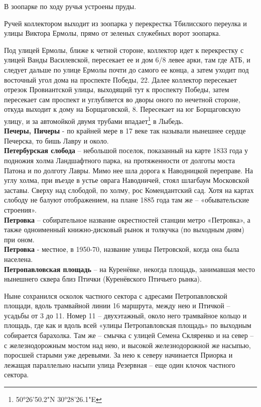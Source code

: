 В зоопарке по ходу ручья устроены пруды.

Ручей коллектором выходит из зоопарка у перекрестка Тбилисского переулка и улицы Виктора Ермолы, прямо от зеленых служебных ворот зоопарка.

Под улицей Ермолы, ближе к четной стороне, коллектор идет к перекрестку с улицей Ванды Василевской, пересекает ее и дом 6/8 левее арки, там где АТБ, и следует дальше по улице Ермолы почти до самого ее конца, а затем уходит под восточный угол дома на проспекте Победы, 22. Далее коллектор пересекает отрезок Провиантской улицы, выходящий тут к проспекту Победы, затем пересекает сам проспект и углубляется во дворы оного по нечетной стороне, откуда выходит к дому на Борщаговской, 8. Пересекает на юг Борщаговскую улицу, и за автомойкой двумя трубами впадает\footnote{50°26'50.2"N 30°28'26.1"E} в Лыбедь.\\

\textbf{Печеры, Пичеры} - по крайней мере в 17 веке так называли нынешнее сердце Печерска, то бишь Лавру и около.\\

\textbf{Петербурская слобода} – небольшой поселок, показанный на карте 1833 года у подножия холма Ландшафтного парка, на протяженности от долготы моста Патона и по долготу Лавры. Мимо нее шла дорога к Наводницкой переправе. На углу холма, при въезде в устье оврага Наводничей, стоял шлагбаум Московской заставы. Сверху над слободой, по холму, рос Комендантский сад. Хотя на картах слободу не балуют отображением, на плане 1885 года там же – «обывательские строения».\\

\textbf{Петровка} – собирательное название окрестностей станции метро «Петровка», а также одноименный книжно-дисковый рынок и толкучка (по выходным дням) при оном.\\

\textbf{Петровка} - местное, в 1950-70, название улицы Петровской, когда она была населена.\\

\textbf{Петропавловская площадь} – на Куренёвке, некогда площадь, занимавшая место нынешнего сквера близ Птички (Куренёвского Птичьего рынка). 

Ныне сохранился осколок частного сектора с адресами Петропавловской площади, вдоль трамвайной линии 16 маршрута, между нею и Птичкой – усадьбы от 3 до 11. Номер 11 – двухэтажный, около него трамвайное кольцо и площадь, где как и вдоль всей «улицы Петропавловская площадь» по выходным собирается барахолка. Там же – смычка с улицей Семена Скляренко и на север – с железнодорожным мостом над нею, и высокой железнодорожной же насыпью, поросшей старыми уже деревьями. За нею к северу начинается Приорка и лежащая параллельно насыпи улица Резервная – еще один клочок частного сектора.\\

